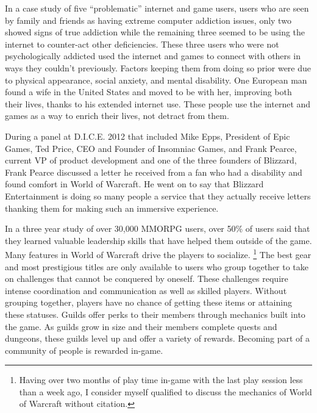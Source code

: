 \documentclass[11pt]{article}
\begin{document}
\begin{multicols}{2}
In a case study of five ``problematic'' internet and game users, users who are seen by family and friends as having extreme computer addiction issues, only two showed signs of true addiction while the remaining three seemed to be using the internet to counter-act other deficiencies. \cite{IsThereEvidenceOfInternetAddiction} These three users who were not psychologically addicted used the internet and games to connect with others in ways they couldn't previously. Factors keeping them from doing so prior were due to physical appearance, social anxiety, and mental disability. One European man found a wife in the United States and moved to be with her, improving both their lives, thanks to his extended internet use. \cite{IsThereEvidenceOfInternetAddiction} These people use the internet and games as a way to enrich their lives, not detract from them.

During a panel at D.I.C.E. 2012 \cite{DICEInterview} that included Mike Epps, President of Epic Games, Ted Price, CEO and Founder of Insomniac Games, and Frank Pearce, current VP of product development and one of the three founders of Blizzard, Frank Pearce discussed a letter he received from a fan who had a disability and found comfort in World of Warcraft. He went on to say that Blizzard Entertainment is doing so many people a service that they actually receive letters thanking them for making such an immersive experience. \cite{DICEInterview}

In a three year study of over 30,000 MMORPG users, over 50\% of users said that they learned valuable leadership skills that have helped them outside of the game. \cite{MotivationsAndDerviedExperiences}
Many features in World of Warcraft drive the players to socialize. \footnote{Having over two months of play time in-game with the last play session less than a week ago, I consider myself qualified to discuss the mechanics of World of Warcraft without citation.} The best gear and most prestigious titles are only available to users who group together to take on challenges that cannot be conquered by oneself. These challenges require intense coordination and communication as well as skilled players. Without grouping together, players have no chance of getting these items or attaining these statuses.
Guilds offer perks to their members through mechanics built into the game. As guilds grow in size and their members complete quests and dungeons, these guilds level up and offer a variety of rewards. Becoming part of a community of people is rewarded in-game.


\end{multicols}
\end{document}
